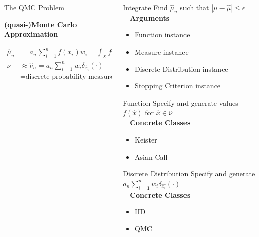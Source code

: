\documentclass[final]{beamer}
\newcommand{\bfCenter}[1]{\centerline{\textbf{#1}}}
\newlength{\onecolwid}
\newlength{\threecolwid}
\newcommand{\dif}{\mathrm{d}}
\begin{document}
\begin{frame}[t]
\begin{columns}[t]
\begin{column}{\threecolwid}
\begin{columns}[t,totalwidth=\threecolwid]
\begin{column}{\onecolwid}
\begin{block}{The QMC Problem}
    \vspace{2ex}
    \bfCenter{(quasi-)Monte Carlo Approximation}
        \begin{align*}
            \hat{\mu}_n &= a_n \sum_{i=1}^{n} f(x_i)w_i =  \int_{X} f(x) \, \hat{\nu}( \dif x)
            \label{qmcApprox}
	\\ \nu & \approx \hat{\nu}_n = a_n \sum_{i=1}^n w_i \delta_{\hat{x_i}}(\cdot) \\
            & = \text{discrete probability measure}
        \end{align*}
\end{block}
\end{column}


\begin{column}{\onecolwid}
\begin{alertblock}{Integrate}
    Find $\hat{\mu}_n$ such that $\left | \mu - \hat{\mu} \right  | \leq \epsilon$ \\[1ex]~\
    \textbf{Arguments}
    \begin{itemize}
        \item Function instance
        \item Measure instance
        \item Discrete Distribution instance
        \item Stopping Criterion instance
    \end{itemize}
\end{alertblock}

\begin{alertblock}{Function}
    Specify and generate values $f(\hat{x})$ for $\hat{x} \in \hat{\nu}$ \\[1ex]~\
    \textbf{Concrete Classes}
    \begin{itemize}
        \item Keister
        \item Asian Call
    \end{itemize}
\end{alertblock}

\begin{alertblock}{Discrete Distribution}
    Specify and generate $a_n \sum_{i=1}^n w_i \delta_{\hat{x_i}}(\cdot)$ \\[1ex]~\
    \textbf{Concrete Classes}
    \begin{itemize}
        \item IID
        \item QMC
    \end{itemize}
\end{alertblock}
\end{column} 


\end{columns}
\end{column}
\end{columns}
\end{frame}
\end{document}
